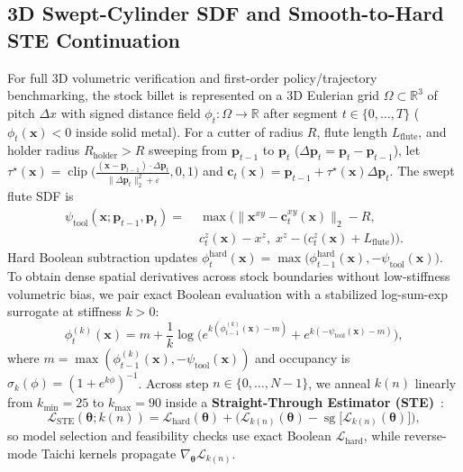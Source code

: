 \documentclass[conference]{IEEEtran}
\begin{document}
\subsection{3D Swept-Cylinder SDF and Smooth-to-Hard STE Continuation}
For full 3D volumetric verification and first-order policy/trajectory benchmarking, the stock billet is represented on a 3D Eulerian grid $\Omega \subset \mathbb{R}^3$ of pitch $\Delta x$ with signed distance field $\phi_t : \Omega \to \mathbb{R}$ after segment $t \in \{0,\dots,T\}$ ($\phi_t(\mathbf{x}) < 0$ inside solid metal). For a cutter of radius $R$, flute length $L_{\text{flute}}$, and holder radius $R_{\text{holder}} > R$ sweeping from $\mathbf{p}_{t-1}$ to $\mathbf{p}_t$ ($\Delta\mathbf{p}_t = \mathbf{p}_t - \mathbf{p}_{t-1}$), let $\tau^\star(\mathbf{x}) = \operatorname{clip}\!\big(\frac{(\mathbf{x} - \mathbf{p}_{t-1})\cdot \Delta\mathbf{p}_t}{\|\Delta\mathbf{p}_t\|_2^2 + \varepsilon}, 0, 1\big)$ and $\mathbf{c}_t(\mathbf{x}) = \mathbf{p}_{t-1} + \tau^\star(\mathbf{x})\Delta\mathbf{p}_t$. The swept flute SDF is
\begin{equation}
  \begin{aligned}
    \psi_{\text{tool}}(\mathbf{x}; \mathbf{p}_{t-1}, \mathbf{p}_t) =\;& \max\Big(
      \|\mathbf{x}^{xy} - \mathbf{c}_t^{xy}(\mathbf{x})\|_2 - R, \\
      &c_t^z(\mathbf{x}) - x^z,\; x^z - \big(c_t^z(\mathbf{x}) + L_{\text{flute}}\big)\Big).
  \end{aligned}
  \label{eq:swept_tool}
\end{equation}
Hard Boolean subtraction updates $\phi_t^{\text{hard}}(\mathbf{x}) = \max\!\big(\phi_{t-1}^{\text{hard}}(\mathbf{x}), -\psi_{\text{tool}}(\mathbf{x})\big)$. To obtain dense spatial derivatives across stock boundaries without low-stiffness volumetric bias, we pair exact Boolean evaluation with a stabilized log-sum-exp surrogate at stiffness $k > 0$:
\begin{equation}
  \phi_t^{(k)}(\mathbf{x}) = m + \frac{1}{k}\log\!\Big(e^{k(\phi_{t-1}^{(k)}(\mathbf{x}) - m)} + e^{k(-\psi_{\text{tool}}(\mathbf{x}) - m)}\Big),
  \label{eq:soft_csg}
\end{equation}
where $m = \max(\phi_{t-1}^{(k)}(\mathbf{x}), -\psi_{\text{tool}}(\mathbf{x}))$ and occupancy is $\sigma_k(\phi) = (1 + e^{k\phi})^{-1}$. Across step $n \in \{0,\dots,N-1\}$, we anneal $k(n)$ linearly from $k_{\min}=25$ to $k_{\max}=90$ inside a \textbf{Straight-Through Estimator (STE)}~\cite{bengio2013estimating}:
\begin{equation}
  \mathcal{L}_{\text{STE}}(\boldsymbol{\theta}; k(n)) = \mathcal{L}_{\text{hard}}(\boldsymbol{\theta}) + \Big(\mathcal{L}_{k(n)}(\boldsymbol{\theta}) - \operatorname{sg}\!\big[\mathcal{L}_{k(n)}(\boldsymbol{\theta})\big]\Big),
  \label{eq:ste}
\end{equation}
so model selection and feasibility checks use exact Boolean $\mathcal{L}_{\text{hard}}$, while reverse-mode Taichi kernels propagate $\nabla_{\boldsymbol{\theta}}\mathcal{L}_{k(n)}$.
\end{document}
